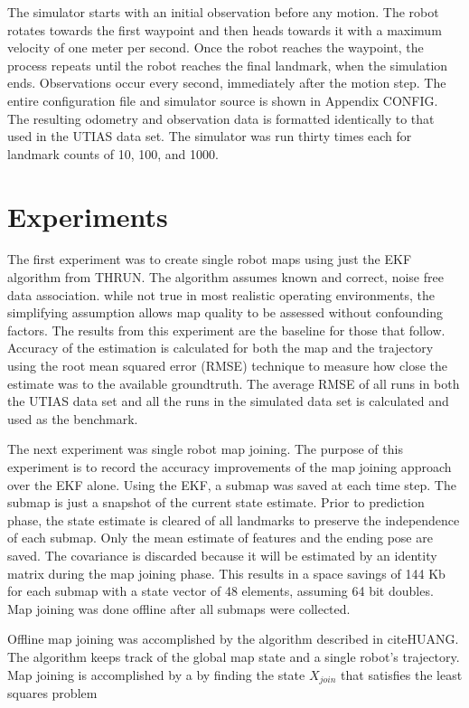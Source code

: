 \documentclass[12pt]{report}
\begin{document}
The simulator starts with an initial observation before any motion.  The robot rotates towards the first waypoint and then heads towards it with a maximum velocity of one meter per second.  Once the robot reaches the waypoint, the process repeats until the robot reaches the final landmark, when the simulation ends.  Observations occur every second, immediately after the motion step.  The entire configuration file and simulator source is shown in Appendix {CONFIG}.  The resulting odometry and observation data is formatted identically to that used in the UTIAS data set.  The simulator was run thirty times each for landmark counts of 10, 100, and 1000.

\section{Experiments}
The first experiment was to create single robot maps using just the EKF algorithm from THRUN.  The algorithm assumes known and correct, noise free data association.  while not true in most realistic operating environments, the simplifying assumption allows map quality to be assessed without confounding factors.  The results from this experiment are the baseline for those that follow. Accuracy of the estimation is calculated for both the map and the trajectory using the root mean squared error (RMSE) technique to measure how close the estimate was to the available groundtruth.  The average RMSE of all runs in both the UTIAS data set and all the runs in the simulated data set is calculated and used as the benchmark.  

The next experiment was single robot map joining.  The purpose of this experiment is to record the accuracy improvements of the map joining approach over the EKF alone.  Using the EKF, a submap was saved at each time step.  The submap is just a snapshot of the current state estimate.  Prior to prediction phase, the state estimate is cleared of all landmarks to preserve the independence of each submap.  Only the mean estimate of features and the ending pose are saved.  The covariance is discarded because it will be estimated by an identity matrix during the map joining phase.  This results in a space savings of 144 Kb for each submap with a state vector of 48 elements, assuming 64 bit doubles.  Map joining was done offline after all submaps were collected. 

Offline map joining was accomplished by the algorithm described in cite{HUANG}.  The algorithm keeps track of the global map state and a single robot's trajectory.  Map joining is accomplished by a by finding the state $X_{join}$ that satisfies the least squares problem 
\end{document}
